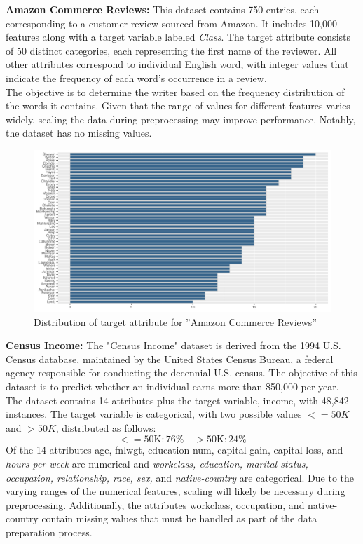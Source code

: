 \documentclass[a4paper,10pt]{article}
\begin{document}
\textbf{Amazon Commerce Reviews:} This dataset contains 750 entries, each corresponding to a customer review sourced from Amazon. It includes 10,000 features along with a target variable labeled \emph{Class}. The target attribute consists of 50 distinct categories, each representing the first name of the reviewer. All other attributes correspond to individual English word, with integer values that indicate the frequency of each word’s occurrence in a review. \\
The objective is to determine the writer based on the frequency distribution of the words it contains. Given that the range of values for different features varies widely, scaling the data during preprocessing may improve performance. Notably, the dataset has no missing values.
\begin{figure}[h!]
    \centering
    \includegraphics[width=0.75\linewidth]{amazon/plots/plot_amazon_classes.pdf}
    \caption{Distribution of target attribute for ”Amazon Commerce Reviews”}
    \label{fig:amazondist}
\end{figure}

\textbf{Census Income:} The "Census Income" dataset is derived from the 1994 U.S. Census database, maintained by the United States Census Bureau, a federal agency responsible for conducting the decennial U.S. census. The objective of this dataset is to predict whether an individual earns more than \$50,000 per year. The dataset contains 14 attributes plus the target variable, income, with 48,842 instances. The target variable is categorical, with two possible values $<=50K$ and $>50K$, distributed as follows:
\begin{equation*}
    <=\text{50K:}\,76\% \quad >\text{50K:}\,24\%
\end{equation*}        
Of the 14 attributes {age, fnlwgt, education-num, capital-gain, capital-loss,} and \emph{hours-per-week} are numerical and \emph{workclass, education, marital-status, occupation, relationship, race, sex,} and \emph{native-country} are categorical. Due to the varying ranges of the numerical features, scaling will likely be necessary during preprocessing. Additionally, the attributes workclass, occupation, and native-country contain missing values that must be handled as part of the data preparation process.
\end{document}
